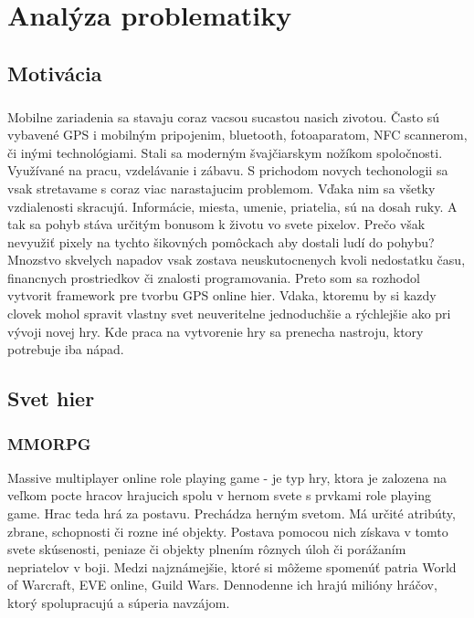 \chapter{Analýza problematiky}
\section{Motivácia}
\paragraph{}
Mobilne zariadenia sa stavaju coraz vacsou sucastou nasich zivotou. Často sú vybavené GPS i mobilným pripojenim, bluetooth, fotoaparatom, NFC scannerom, či inými technológiami. Stali sa moderným švajčiarskym nožíkom spoločnosti. Využívané na pracu, vzdelávanie i zábavu. S prichodom novych techonologii sa vsak stretavame s coraz viac narastajucim problemom. Vďaka nim sa všetky vzdialenosti skracujú. Informácie, miesta, umenie, priatelia, sú na dosah ruky. A tak sa pohyb stáva určitým bonusom k životu vo svete pixelov. Prečo však nevyužiť pixely na tychto šikovných pomôckach aby dostali ludí do pohybu?\\
Mnozstvo skvelych napadov vsak zostava neuskutocnenych kvoli nedostatku času, financnych prostriedkov či znalosti programovania. Preto som sa rozhodol vytvorit framework pre tvorbu GPS online hier. Vdaka, ktoremu by si kazdy clovek mohol spravit vlastny svet neuveritelne jednoduchšie a rýchlejšie ako pri vývoji novej hry. Kde praca na vytvorenie hry sa prenecha nastroju, ktory potrebuje iba nápad.

\section{Svet hier}
\subsection{MMORPG}
Massive multiplayer online role playing game - je typ hry, ktora je zalozena na veľkom pocte hracov hrajucich spolu v hernom svete s prvkami role playing game. Hrac teda hrá za postavu. Prechádza herným svetom. Má určité atribúty, zbrane, schopnosti či rozne iné objekty. Postava pomocou nich získava v tomto svete skúsenosti, peniaze či objekty plnením rôznych úloh či porážaním nepriatelov v boji. 
Medzi najznámejšie, ktoré si môžeme spomenúť patria World of Warcraft, EVE online, Guild Wars. Dennodenne ich hrajú milióny hráčov, ktorý spolupracujú a súperia navzájom.

